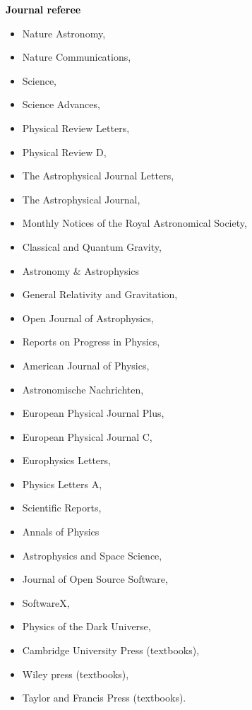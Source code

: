 \textbf{\textcolor{black}{Journal referee}}\vspace{0.1cm}\\
\hspace*{0.35cm}%
\begin{minipage}[t]{\dimexpr(\textwidth-0.4cm-0.2cm)/2\relax}
\raggedright
\begin{itemize}[label=$\circ$,leftmargin=1em,labelsep=0.4em]
\item Nature Astronomy,
\item Nature Communications,
\item Science,
\item Science Advances,
\item Physical Review Letters,
\item Physical Review D,
\item The Astrophysical Journal Letters,
\item The Astrophysical Journal,
\item Monthly Notices of the Royal Astronomical Society,
\item Classical and Quantum Gravity,
\item Astronomy \& Astrophysics
\item General Relativity and Gravitation,
\item Open Journal of Astrophysics,
\item Reports on Progress in Physics,
\item American Journal of Physics,
\end{itemize}
\end{minipage}%
\hspace{0.2cm}%
\begin{minipage}[t]{\dimexpr(\textwidth-0.4cm-0.2cm)/2\relax}
\raggedright
\begin{itemize}[label=$\circ$,leftmargin=1em,labelsep=0.4em]
\item Astronomische Nachrichten,
\item European Physical Journal Plus,
\item European Physical Journal C,
\item Europhysics Letters,
\item Physics Letters A,
\item Scientific Reports,
\item Annals of Physics
\item Astrophysics and Space Science,
\item Journal of Open Source Software,
\item SoftwareX,
\item Physics of the Dark Universe,
\item Cambridge University Press (textbooks),
\item Wiley press (textbooks),
\item Taylor and Francis Press (textbooks).
\end{itemize}
\end{minipage}

